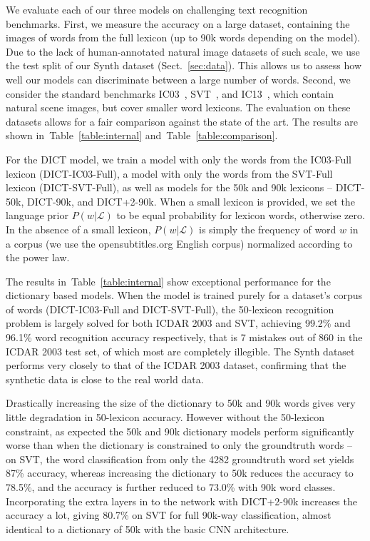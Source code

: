 \documentclass{article} \usepackage{nips14submit_e,times}
\newcommand{\tblref}[1]{Table~\ref{#1}}
\renewcommand{\paragraph}[1]{\par\noindent{\bf #1}}
\begin{document}
We evaluate each of our three models on challenging text recognition benchmarks. First, we measure the accuracy on a large dataset, containing the images of words from the full lexicon (up to 90k words depending on the model). Due to the lack of human-annotated natural image datasets of such scale, we use the test split of our Synth dataset (Sect.~\ref{sec:data}). This allows us to assess how well our models can discriminate between a large number of words. Second, we consider the standard benchmarks IC03~\cite{ICDAR03}, SVT~\cite{Wang11}, and IC13~\cite{ICDAR2013}, which contain natural scene images, but cover smaller word lexicons. The evaluation on these datasets allows for a fair comparison against the state of the art. The results are shown in~\tblref{table:internal} and~\tblref{table:comparison}. 

\paragraph{Dictionary Encoding.}
For the DICT model, we train a model with only the words from the IC03-Full lexicon (DICT-IC03-Full), a model with only the words from the SVT-Full lexicon (DICT-SVT-Full), as well as models for the 50k and 90k lexicons -- DICT-50k, DICT-90k, and DICT+2-90k. When a small lexicon is provided, we set the language prior $P(w|\mathcal{L})$ to be equal probability for lexicon words, otherwise zero. In the absence of a small lexicon, $P(w|\mathcal{L})$ is simply the frequency of word $w$ in a corpus (we use the opensubtitles.org English corpus) normalized according to the power law.

The results in~\tblref{table:internal} show exceptional performance for the dictionary based models. When the model is trained purely for a dataset's corpus of words (DICT-IC03-Full and DICT-SVT-Full), the 50-lexicon recognition problem is largely solved for both ICDAR 2003 and SVT, achieving 99.2\% and 96.1\% word recognition accuracy respectively, that is 7 mistakes out of 860 in the ICDAR 2003 test set, of which most are completely illegible. 
The Synth dataset performs very closely to that of the ICDAR 2003 dataset, confirming that the synthetic data is close to the real world data.

Drastically increasing the size of the dictionary to 50k and 90k words gives very little degradation in 50-lexicon accuracy. However without the 50-lexicon constraint, as expected the 50k and 90k dictionary models perform significantly worse than when the dictionary is constrained to only the groundtruth words -- on SVT, the word classification from only the 4282 groundtruth word set yields 87\% accuracy, whereas increasing the dictionary to 50k reduces the accuracy to 78.5\%, and the accuracy is further reduced to 73.0\% with 90k word classes. Incorporating the extra layers in to the network with DICT+2-90k increases the accuracy a lot, giving 80.7\% on SVT for full 90k-way classification, almost identical to a dictionary of 50k with the basic CNN architecture.
\end{document}
